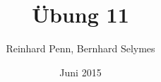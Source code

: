 \documentclass[12pt,a4paper]{article}
\begin{document}
\title{Übung 11}
\author{Reinhard Penn, Bernhard Selymes}
\date{Juni 2015}

\normalsize


\newcommand{\srcpath}{../../src}
\newcommand{\simpath}{../../sim}



%
%
%
%
%
%
%
\end{document}
